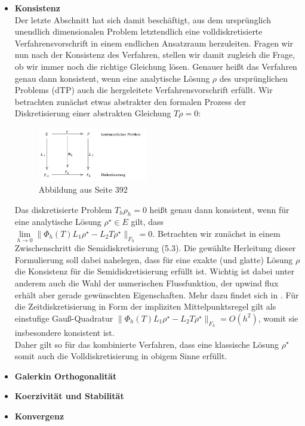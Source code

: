 \begin{itemize}
	\item \textbf{Konsistenz} \\
	 Der letzte Abschnitt hat sich damit beschäftigt, aus dem ursprünglich unendlich dimensionalen Problem letztendlich eine volldiskretisierte Verfahrensvorschrift in einem endlichen Ansatzraum herzuleiten. Fragen wir nun nach der Konsistenz des Verfahren, stellen wir damit zugleich die Frage, ob wir immer noch die richtige Gleichung lösen. Genauer heißt das Verfahren genau dann konsistent, wenn eine analytische Lösung $ \rho $ des ursprünglichen Problems (dTP) auch die hergeleitete Verfahrensvorschrift erfüllt. 
	 Wir betrachten zunächst etwas abstrakter den formalen Prozess der Diskretisierung einer abstrakten Gleichung $ T \rho=0 $:
	 \begin{figure}[H]
	 	\centering
	 	\includegraphics[width=0.45\textwidth]{abstraktkonsistenz.png} \\
	 	Abbildung aus \cite{brokate2016grundwissen} Seite 392
	 \end{figure}
	 Das diskretisierte Problem $ T_h \rho_h = 0  $ heißt genau dann konsistent, wenn für eine analytische Lösung $ \rho^{\star} \in E $ gilt, dass $ \lim\limits_{h \to 0}\lVert \Phi_h(T)L_1\rho^{\star} - L_2T\rho^{\star} \rVert_{F_h} = 0 $.
	 Betrachten wir zunächst in einem Zwischenschritt die Semidiskretisierung (5.3).
	 Die gewählte Herleitung dieser Formulierung soll dabei nahelegen, dass für eine exakte (und glatte) Lösung $ \rho $ die Konsistenz für die Semidiskretisierung erfüllt ist. Wichtig ist dabei unter anderem auch die Wahl der numerischen Flussfunktion, der upwind flux erhält aber gerade gewünschten Eigenschaften. 
	 Mehr dazu findet sich in \cite{Har08b}.
	 Für die Zeitdiskretisierung in Form der impliziten Mittelpunktsregel gilt als einstufige Gauß-Quadratur $ \lVert \Phi_h(T)L_1\rho^{\star} - L_2T\rho^{\star} \rVert_{F_h} = O(h^2)$, womit sie insbesondere konsistent ist. \\
	 Daher gilt so für das kombinierte Verfahren, dass eine klassische Lösung $ \rho^{\star} $ somit auch die Volldiskretisierung in obigem Sinne erfüllt. 
	  
	 
	\item \textbf{Galerkin Orthogonalität}
	\item \textbf{Koerzivität und Stabilität}
	\item \textbf{Konvergenz}
\end{itemize}
